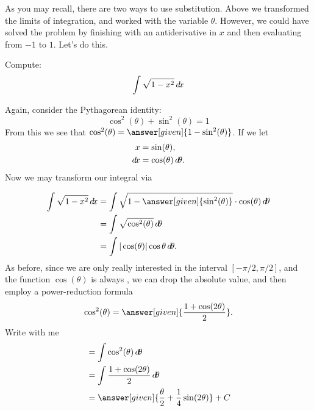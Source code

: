 \documentclass{ximera}
\begin{document}
As you may recall, there are two ways to use substitution. Above we
transformed the limits of integration, and worked with the variable
$\theta$. However, we could have solved the problem by finishing with
an antiderivative in $x$ and then evaluating from $-1$ to $1$. Let's
do this.

\begin{example}
  Compute:
  \[
  \int \sqrt{1-x^2} \mathop{}\!d\! x
  \]
  \begin{explanation}
    Again, consider the Pythagorean identity:
    \[
    \cos^2(\theta) + \sin^2(\theta) = 1
    \]
    From this we see that $\cos^2(\theta)=
    \answer[given]{1-\sin^2(\theta)}$.  If we let
    \begin{align*}
      x &=\sin(\theta),\\
      \mathop{}\!d\! x &= \cos(\theta) \mathop{}\!d\!\theta.
    \end{align*}
    Now we may transform our integral via
    \begin{image}
    \end{image}
    \begin{align*}
      \int \sqrt{1-x^2} \d x &= \int \sqrt{1-\answer[given]{\sin^2(\theta)}} \cdot \cos(\theta) \d \theta \\
      &= \int \sqrt{\cos^2(\theta)}\d\theta \\
      &=\int |\cos(\theta)| \cos\theta \d\theta.
    \end{align*}
    As before, since we are only really interested in the interval
    $[-\pi/2,\pi/2]$, and the function $\cos(\theta)$ is always
    ,
    we can drop the absolute value, and then employ a power-reduction
    formula
    \[
    \cos^2(\theta)= \answer[given]{\frac{1+\cos(2\theta)}{2}}.
    \]
    Write with me
    \begin{align*}
      &= \int \cos^2(\theta) \d \theta \\
      &= \int \frac{1+\cos(2\theta)}{2} \d \theta\\
      &= \answer[given]{\frac{\theta}{2} +\frac{1}{4}\sin(2\theta)}+C
    \end{align*}

\end{explanation}
\end{example}
\end{document}
